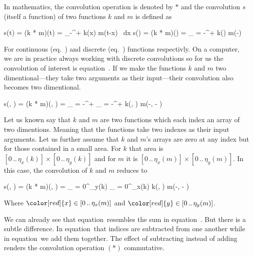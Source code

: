 In mathematics, the convolution operation is denoted by $*$ and the convolution $s$ (itself a function) of two functions $k$ and $m$ is defined as

\startplaceformula[reference=cont-conv]
\startformula
s(t) = (k * m)(t) = \int_{{-}\infty}^{{+}\infty} k(x) \cdot m(t-x) \, {\rm d}x
\stopformula
\stopplaceformula
\startplaceformula[reference=disc-conv]
\startformula
s(\color[red]{x}) = (k * m)(\color[red]{x}) = \sum_{\color[blue]{x'} = {-}\infty}^{{+}\infty} k(\color[blue]{x'}) \cdot m(\color[red]{x}-\color[blue]{x'})
\stopformula
\stopplaceformula

For continuous (eq.~) and discrete (eq.~) functions respectivly.
On a computer, we are in practice always working with discrete convolutions so for us the convolution of interest is equation~.
If we make the functions $k$ and $m$ two dimentional---they take two arguments as their input---their convolution also becomes two dimentional.

\startplaceformula[reference=twodim-disc-conv]
\startformula
s(\color[red]{x}, \color[red]{y}) = (k * m)(\color[red]{x}, \color[red]{y}) =
\sum_{\color[blue]{y'} = {-}\infty}^{{+}\infty}
\sum_{\color[blue]{x'} = {-}\infty}^{{+}\infty}
k(\color[blue]{x'}, \color[blue]{y'}) \cdot m(\color[red]{x}-\color[blue]{x'}, \color[red]{y} - \color[blue]{y'})
\stopformula
\stopplaceformula

\indentation
Let us known say that $k$ and $m$ are two functions which each index an array of two dimentions.
Meaning that the functions take two indexes as their input arguments.
Let us further assume that $k$ and $m$'s arrays are zero at any index but for those contained in a small area.
For $k$ that area is $[0 \, .. \, \eta_x(k)] \times [0 \, .. \, \eta_y(k)]$ and for $m$ it is $[0 \, .. \, \eta_x(m)] \times [0 \, .. \, \eta_y(m)]$.
In this case, the convolution of $k$ and $m$ reduces to

\startplaceformula[reference=twodim-disc-conv-finite]
\startformula
s(\color[red]{x}, \color[red]{y}) = (k * m)(\color[red]{x}, \color[red]{y}) = 
\sum_{\color[blue]{y'} = 0}^{\eta_y(k)} 
\sum_{\color[blue]{x'} = 0}^{\eta_x(k)} 
k(\color[blue]{x'}, \color[blue]{y'}) \cdot m(\color[red]{x}-\color[blue]{x'}, \color[red]{y} - \color[blue]{y'})
\stopformula
\stopplaceformula

Where $\color[red]{x} \in [0 \, .. \, \eta_x(m)]$ and $\color[red]{y} \in [0 \, .. \, \eta_y(m)]$.

We can already see that equation~ resembles the  sum in equation~.
But there is a subtle difference.
In equation~ that indices are subtracted from one another while in equation~ we add them together.
The effect of subtracting instead of adding renders the convolution operation $(*)$ commutative.

